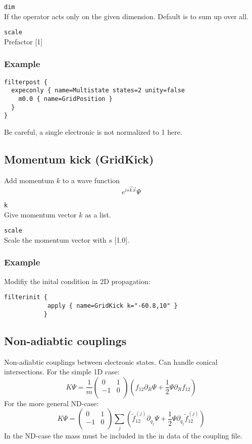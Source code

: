 \documentclass[a4paper,12pt]{scrbook}
\newcommand{\option}[2]{\item \texttt{#1}\\ #2}
\begin{document}
\begin{options}
 \option{dim}{If the operator acts only on the given dimension. Default is to sum up over all.}
  \option{scale}{Prefactor [1]}
\end{options}

\subsubsection*{Example}
\begin{verbatim}
filterpost {
  expeconly { name=Multistate states=2 unity=false 
    m0.0 { name=GridPosition }
  }
}
\end{verbatim}
Be careful, a single electronic is not normalized to 1 here.

\subsection{Momentum kick (GridKick)}
Add momentum $k$ to a wave function
\begin{equation}
 e^{i s \vec{k} \vec{x}} \Psi
\end{equation}
\begin{options}
 \option{k}{Give momentum vector $k$ as a list.}
 \option{scale}{Scale the momentum vector with $s$ [1.0].}
\end{options}

\subsubsection*{Example}
Modifiy the inital condition in 2D propagation:
\begin{verbatim} 
filterinit {
            apply { name=GridKick k="-60.8,10" }
           }
\end{verbatim}


\subsection{Non-adiabtic couplings}
Non-adiabtic couplings between electronic states. Can handle conical intersections.
For the simple 1D case:
\begin{equation}
 K \Psi = \frac{1}{m}
\begin{pmatrix}
 0 & 1 \\
-1 & 0 \\
\end{pmatrix}
\left (
f_{12} \partial_R \Psi + \dfrac{1}{2} \Psi \partial_R f_{12}
\right )
\end{equation}
For the more general ND-case:
\begin{equation}
 K \Psi =
\begin{pmatrix}
 0 & 1 \\
-1 & 0 \\
\end{pmatrix}
\sum_j \left (
\tilde f_{12}^{(j)} \partial_{q_j} \Psi + \dfrac{1}{2} \Psi \partial_{q_j} \tilde f_{12}^{(j)}
\right )
\end{equation}
In the ND-case the mass must be included in the in data of the coupling file.
\end{document}

